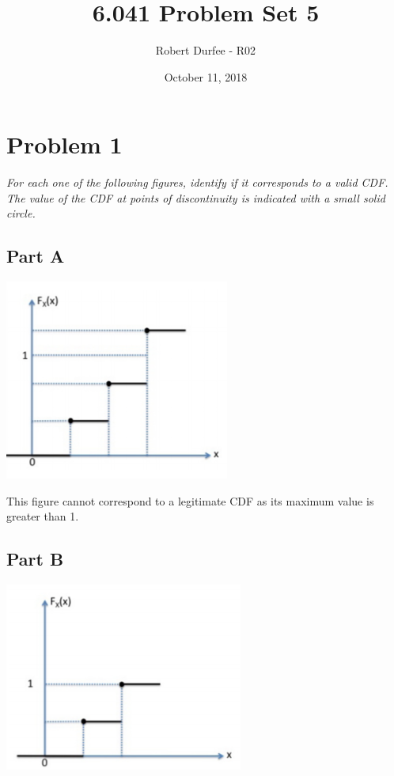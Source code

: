 \documentclass{article}
\title{6.041 Problem Set 5}
\author{Robert Durfee - R02}
\date{October 11, 2018}
\begin{document}
\maketitle

\section*{Problem 1}

\textit{For each one of the following figures, identify if it corresponds to
a valid CDF. The value of the CDF at points of discontinuity is indicated
with a small solid circle.}

\subsection*{Part A}

\begin{center}
    \includegraphics[scale=1]{Images/P1A.PNG}
\end{center}

This figure cannot correspond to a legitimate CDF as its maximum value is
greater than 1.

\subsection*{Part B}

\begin{center}
    \includegraphics[scale=1]{Images/P1B.PNG}
\end{center}
\end{document}
